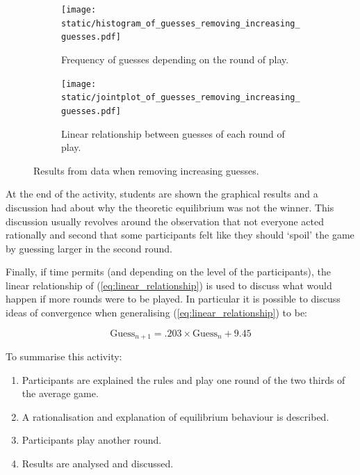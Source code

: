 \documentclass[12pt]{article}
\begin{document}
\begin{figure}[!hbtp]
    \begin{subfigure}{.6\textwidth}
        \centering
        \texttt{[image: static/histogram\_of\_guesses\_removing\_increasing\_guesses.pdf]}
        \caption{Frequency of guesses depending on the round of play.}
        \label{fig:histogram_of_guess}
    \end{subfigure}
    \begin{subfigure}{.4\textwidth}
        \centering
        \texttt{[image: static/jointplot\_of\_guesses\_removing\_increasing\_guesses.pdf]}
        \caption{Linear relationship between guesses of each round of play.}
        \label{fig:jointplot_of_guess}
    \end{subfigure}
    \caption{Results from data when removing increasing guesses.}
    \label{fig:results_with_decreasing_guess}
\end{figure}

At the end of the activity, students are shown the graphical results and a
discussion had about why the theoretic equilibrium was not the winner. This
discussion usually revolves around the observation that not everyone acted
rationally and second that some participants felt like they should `spoil' the
game by guessing larger in the second round.

Finally, if time permits (and depending on the level of the participants), the
linear relationship of (\ref{eq:linear_relationship}) is used to discuss what
would happen if more rounds were to be played. In particular it is possible to
discuss ideas of convergence when generalising (\ref{eq:linear_relationship}) to
be:

\begin{equation}
    \text{Guess}_{n+1} = .203\times\text{Guess}_n + 9.45
    \label{eq:extrapolated_linear_relationship}
\end{equation}

To summarise this activity:

\begin{enumerate}
    \item Participants are explained the rules and play one round of the two
        thirds of the average game.
    \item A rationalisation and explanation of equilibrium behaviour is
        described.
    \item Participants play another round.
    \item Results are analysed and discussed.
\end{enumerate}
\end{document}
